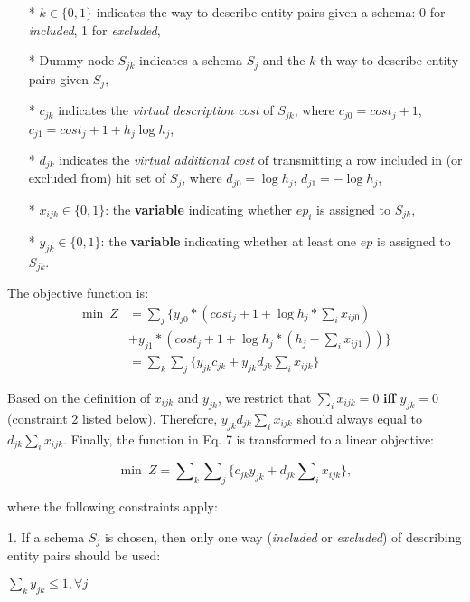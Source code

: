 \begin{itemize}
  \item[*] $k \in \{0, 1\}$ indicates the way to describe entity pairs
  given a schema: 0 for \textit{included}, 1 for \textit{excluded},
  \item[*] Dummy node $S_{jk}$ indicates a schema $S_j$ and the $k$-th
  way to describe entity pairs given $S_j$,
  \item[*] $c_{jk}$ indicates the \textit{virtual description cost} of
  $S_{jk}$, where $c_{j0} = cost_j + 1$, $c_{j1} = cost_j + 1 + h_j \log h_j$,
  \item[*] $d_{jk}$ indicates the \textit{virtual additional cost} of transmitting
  a row included in (or excluded from) hit set of $S_j$, where $d_{j0} = 
  \log h_j$, $d_{j1} = - \log h_j$,
  \item[*] $x_{ijk} \in \{0, 1\}$: the \textbf{variable} indicating whether
  $ep_i$ is assigned to $S_{jk}$,
  \item[*] $y_{jk} \in \{0, 1\}$: the \textbf{variable} indicating whether
  at least one $ep$ is assigned to $S_{jk}$.
\end{itemize}

The objective function is: 
\begin{equation}
\begin{aligned}
  \min ~ Z & = \sum\nolimits_j \{ y_{j0} * (cost_j + 1 + \log h_j * \sum\nolimits_i x_{ij0} ) \\
           & + y_{j1} * (cost_j + 1 + \log h_j * (h_j - \sum\nolimits_i x_{ij1}) ) \}  \\
           & = \sum\nolimits_k \sum\nolimits_j \{ y_{jk} c_{jk} + y_{jk} d_{jk} \sum\nolimits_i x_{ijk} \}
\end{aligned}
\end{equation}

Based on the definition of $x_{ijk}$ and $y_{jk}$, 
we restrict that $\sum\nolimits_i x_{ijk} = 0$ \textbf{iff} $y_{jk} = 0$ (constraint 2 listed below).
Therefore, $y_{jk} d_{jk} \sum\nolimits_i x_{ijk}$ should always equal to $d_{jk} \sum\nolimits_i x_{ijk}$.
Finally, the function in Eq. 7 is transformed to a linear objective: 

\begin{equation}
  \min ~ Z = \sum\nolimits_k \sum\nolimits_j 
        \{ c_{jk} y_{jk} + d_{jk} \sum\nolimits_i x_{ijk} \},
\end{equation}

where the following constraints apply:

1. If a schema $S_j$ is chosen, then only one way (\textit{included} or \textit{excluded}) 
of describing entity pairs should be used:
\begin{center}
  $\sum\nolimits_k y_{jk} \leq 1, \forall j$
\end{center}

